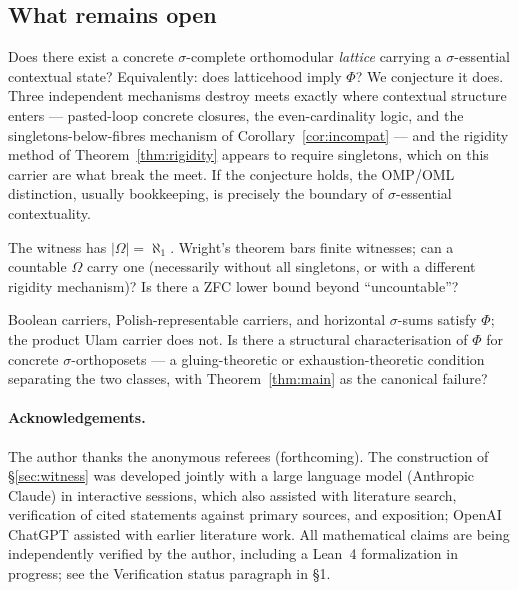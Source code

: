 \subsection*{What remains open}

\begin{question}\label{q:oml}
Does there exist a concrete $\sigma$-complete orthomodular \emph{lattice}
carrying a $\sigma$-essential contextual state? Equivalently: does latticehood
imply $\Phi$? We conjecture it does. Three independent mechanisms destroy meets
exactly where contextual structure enters --- pasted-loop concrete closures, the
even-cardinality logic, and the singletons-below-fibres mechanism of
Corollary~\ref{cor:incompat} --- and the rigidity method of
Theorem~\ref{thm:rigidity} appears to require singletons, which on this carrier
are what break the meet. If the conjecture holds, the OMP/OML distinction,
usually bookkeeping, is precisely the boundary of $\sigma$-essential
contextuality.
\end{question}

\begin{question}[cardinality]\label{q:cardinality}
The witness has $|\Omega|=\aleph_1$. Wright's theorem bars finite witnesses;
can a countable $\Omega$ carry one (necessarily without all singletons, or with
a different rigidity mechanism)? Is there a ZFC lower bound beyond
``uncountable''?
\end{question}

\begin{question}\label{q:phi}
Boolean carriers, Polish-representable carriers, and horizontal $\sigma$-sums
satisfy $\Phi$; the product Ulam carrier does not. Is there a structural
characterisation of $\Phi$ for concrete $\sigma$-orthoposets --- a
gluing-theoretic or exhaustion-theoretic condition separating the two classes,
with Theorem~\ref{thm:main} as the canonical failure?
\end{question}

\paragraph{Acknowledgements.}
The author thanks the anonymous referees (forthcoming). The construction of
\S\ref{sec:witness} was developed jointly with a large language model
(Anthropic Claude) in interactive sessions, which also assisted with literature
search, verification of cited statements against primary sources, and
exposition; OpenAI ChatGPT assisted with earlier literature work. All
mathematical claims are being independently verified by the author, including a
Lean~4 formalization in progress; see the Verification status paragraph in
\S1.
